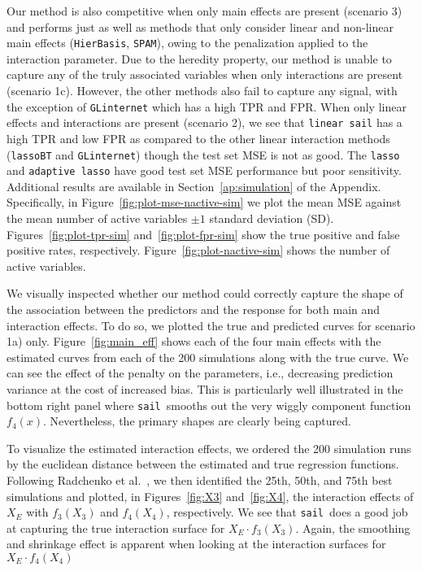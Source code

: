\documentclass[12pt,letter]{article}\usepackage[]{graphicx}\usepackage[]{color}
\newcommand{\sail}{\texttt{sail}}
\begin{document}
Our method is also competitive when only main effects are present (scenario 3) and performs just as well as methods that only consider linear and non-linear main effects (\texttt{HierBasis}, \texttt{SPAM}), owing to the penalization applied to the interaction parameter. Due to the heredity property, our method is unable to capture any of the truly associated variables when only interactions are present (scenario 1c). However, the other methods also fail to capture any signal, with the exception of \texttt{GLinternet} which has a high TPR and FPR. When only linear effects and interactions are present (scenario 2), we see that \texttt{linear sail} has a high TPR and low FPR as compared to the other linear interaction methods (\texttt{lassoBT} and \texttt{GLinternet}) though the test set MSE is not as good. The \texttt{lasso} and \texttt{adaptive lasso} have good test set MSE performance but poor sensitivity. Additional results are available in Section~\ref{ap:simulation} of the Appendix. Specifically, in Figure~\ref{fig:plot-mse-nactive-sim} we plot the mean MSE against the mean number of active variables $\pm 1$ standard deviation (SD). Figures~\ref{fig:plot-tpr-sim} and~\ref{fig:plot-fpr-sim} show the true positive and false positive rates, respectively. Figure~\ref{fig:plot-nactive-sim} shows the number of active variables. 

We visually inspected whether our method could correctly capture the shape of the association between the predictors and the response for both main and interaction effects. To do so, we plotted the true and predicted curves for scenario 1a) only. Figure~\ref{fig:main_eff} shows each of the four main effects with the estimated curves from each of the 200 simulations along with the true curve. We can see the effect of the penalty on the parameters, i.e., decreasing prediction variance at the cost of increased bias. This is particularly well illustrated in the bottom right panel where \sail ~smooths out the very wiggly component function $f_4(x)$. Nevertheless, the primary shapes are clearly being captured.

To visualize the estimated interaction effects, we ordered the 200 simulation runs by the euclidean distance between the estimated and true regression functions. Following Radchenko et al.~\citep{radchenko2010variable}, we then identified the 25th, 50th, and 75th best simulations and plotted, in Figures~\ref{fig:X3} and~\ref{fig:X4}, the interaction effects of $X_E$ with $f_3(X_3)$ and $f_4(X_4)$, respectively. We see that \sail ~does a good job at capturing the true interaction surface for $X_E \cdot f_3(X_3)$. Again, the smoothing and shrinkage effect is apparent when looking at the interaction surfaces for $X_E \cdot f_4(X_4)$
\end{document}
